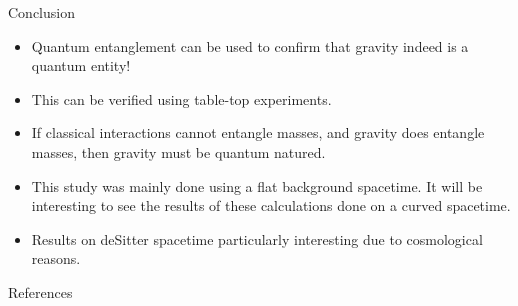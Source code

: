 \documentclass[12pt,aspectratio=1610]{beamer}
\begin{document}
\begin{frame}{Conclusion}
\begin{itemize}
    \item Quantum entanglement can be used to confirm that gravity indeed is a quantum entity!
    \item This can be verified using table-top experiments.
    \item If classical interactions cannot entangle masses, and gravity does entangle masses, then gravity must be quantum natured. \citep{Bose_2017, Marletto_2017}
    \item This study was mainly done using a flat background spacetime. It will be interesting to see the results of these calculations done on a curved spacetime.
    \item Results on deSitter spacetime particularly interesting due to cosmological reasons.
\end{itemize}
    
\end{frame}


\begin{frame}[allowframebreaks]{References}




\end{frame}
\end{document}
